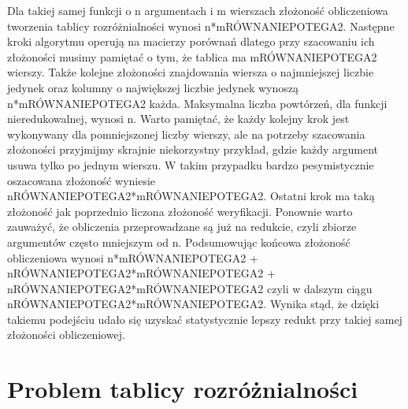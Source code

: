 Dla takiej samej funkcji o n argumentach i m wierszach złożoność obliczeniowa tworzenia tablicy rozróżnialności wynosi n*mRÓWNANIEPOTEGA2. Następne kroki algorytmu operują na macierzy porównań dlatego przy szacowaniu ich złożoności musimy pamiętać o tym, że tablica ma mRÓWNANIEPOTEGA2 wierszy. Także kolejne złożoności znajdowania wiersza o najmniejszej liczbie jedynek oraz kolumny o największej liczbie jedynek wynoszą n*mRÓWNANIEPOTEGA2 każda. Maksymalna liczba powtórzeń, dla funkcji nieredukowalnej, wynosi n. Warto pamiętać, że każdy kolejny krok jest wykonywany dla pomniejszonej liczby wierszy, ale na potrzeby szacowania złożoności przyjmijmy skrajnie niekorzystny przykład, gdzie każdy argument usuwa tylko po jednym wierszu. W takim przypadku bardzo pesymistycznie oszacowana złożoność wyniesie nRÓWNANIEPOTEGA2*mRÓWNANIEPOTEGA2. Ostatni krok ma taką złożoność jak poprzednio liczona złożoność weryfikacji. Ponownie warto zauważyć, że obliczenia przeprowadzane są już na redukcie, czyli zbiorze argumentów często mniejszym od n. Podsumowując końcowa złożoność obliczeniowa wynosi n*mRÓWNANIEPOTEGA2 + nRÓWNANIEPOTEGA2*mRÓWNANIEPOTEGA2 + nRÓWNANIEPOTEGA2*mRÓWNANIEPOTEGA2 czyli w dalszym ciągu nRÓWNANIEPOTEGA2*mRÓWNANIEPOTEGA2. Wynika stąd, że dzięki takiemu podejściu udało się uzyskać statystycznie lepszy redukt przy takiej samej złożoności obliczeniowej.


\section{Problem tablicy rozróżnialności}

